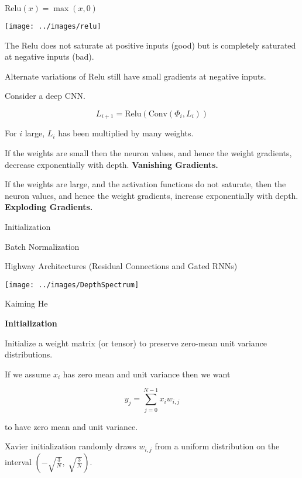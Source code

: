 {

$\mathrm{Relu}(x) = \max(x,0)$

\vfill
\centerline{\texttt{[image: ../images/relu]}}

\vfill
The Relu does not saturate at positive inputs (good) but is completely saturated at negative inputs (bad).

\vfill
Alternate variations of Relu still have small gradients at negative inputs.


Consider a deep CNN.

$$L_{i+1} = \mathrm{Relu}(\mathrm{Conv}(\Phi_i,L_i))$$

\vfill
For $i$ large, $L_i$ has been multiplied by many weights.

\vfill
If the weights are small then the neuron values, and hence the weight gradients, decrease exponentially with depth. {\bf Vanishing Gradients.}

\vfill
If the weights are large, and the activation functions do not saturate, then the neuron values, and hence the weight gradients,
increase exponentially with depth. {\bf Exploding Gradients.}


\centerline{Initialization}

\vfill
\centerline{Batch Normalization}

\vfill
\centerline{Highway Architectures (Residual Connections and Gated RNNs)}


\centerline{\texttt{[image: ../images/DepthSpectrum]}}

\centerline{\large Kaiming He}

\slide{}
\centerline{\bf Initialization}
\vfill


Initialize a weight matrix (or tensor) to preserve zero-mean unit variance distributions.

\vfill
If we assume $x_i$ has zero mean and unit variance then we want

\vfill
$$y_j = \sum_{j=0}^{N-1} x_i w_{i,j}$$

\vfill
to have zero mean and unit variance.

\vfill
Xavier initialization randomly draws $w_{i,j}$ from a uniform distribution on the interval $\left(-\sqrt{\frac{3}{N}},\;\sqrt{\frac{3}{N}}\right)$.

}
